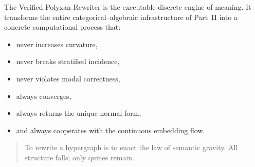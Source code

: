 The Verified Polyxan Rewriter is the executable discrete engine of meaning.
It transforms the entire categorical--algebraic infrastructure of Part~II into a concrete computational process that:
\begin{itemize}
\item never increases curvature,
\item never breaks stratified incidence,
\item never violates modal correctness,
\item always converges,
\item always returns the unique normal form,
\item and always cooperates with the continuous embedding flow.
\end{itemize}

\begin{quote}
To rewrite a hypergraph is to enact the law of semantic gravity.
All structure falls; only quines remain.
\end{quote}


